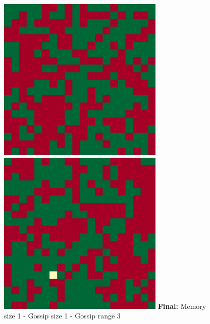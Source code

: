 \documentclass[english]{article}
\begin{document}
\begin{figure}[!h]
{    \includegraphics[width=\textwidth/3]{spatial-memory5+gossip0+range0-B.pdf}
    \includegraphics[width=\textwidth/3]{spatial-memory5+gossip0+range0-C.pdf}
  }
  \textbf{Final:} Memory size 1 - Gossip size 1 - Gossip range 3

\end{figure}
\end{document}
